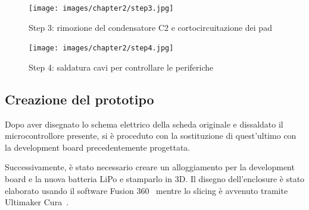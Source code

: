 \begin{figure}[H]
  \centering
  \begin{minipage}[b]{0.45\textwidth}
    \texttt{[image: images/chapter2/step3.jpg]}
    \caption{Step 3: rimozione del condensatore C2 e cortocircuitazione dei pad}
    \label{fig:step2}  
  \end{minipage}
  \hfill
  \begin{minipage}[b]{0.45\textwidth}
    \texttt{[image: images/chapter2/step4.jpg]}
    \caption{Step 4: saldatura cavi per controllare le periferiche}
    \label{fig:step2}
      \end{minipage}
\end{figure}

\subsection{Creazione del prototipo}

Dopo aver disegnato lo schema elettrico della scheda originale e dissaldato il microcontrollore presente, si è proceduto
con la sostituzione di quest'ultimo con la development board precedentemente progettata.

Successivamente, è stato necessario creare un alloggiamento per la development board e la nuova batteria LiPo e stamparlo in 3D.
Il disegno dell'enclosure è stato elaborato usando il software Fusion 360~\cite{fusion360} mentre lo slicing è avvenuto tramite Ultimaker Cura~\cite{cura}.

